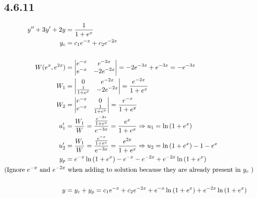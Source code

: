 \documentclass{article}
\begin{document}
\subsection{4.6.11}
\begin{align*}
    y''+3y'+2y &= \frac{1}{1+e^{x}}\\
    y_c &= c_1e^{-x}+c_2e^{-2x}\\\\
    W(e^{x},e^{2x}) &=  \begin{vmatrix}e^{-x} & e^{-2x}\\ e^{-x}& -2e^{-2x}\end{vmatrix} = -2e^{-3x}+e^{-3x}  = -e^{-3x}\\
    W_1 &= \begin{vmatrix} 0 & e^{-2x}\\ \frac{1}{1+e^{x}}  &-2e^{-2x}\end{vmatrix} = \frac{e^{-2x}}{1+e^{x}}     \\
    W_2 &= \begin{vmatrix} e^{-x} & 0\\ e^{-x} & \frac{1}{1+e^{x}} \end{vmatrix} = \frac{e^{-x}}{1+e^{x}}\\  
    u_1' &= \frac{W_1}{W}  = \frac{\frac{e^{-2x}}{1+e^{x}}}{e^{-3x}} =  \frac{e^{x}}{1+e^{x}}  \Rightarrow u_1  = \ln\left(1+e^{x}\right)     \\
    u_2' &= \frac{W_1}{W}  = \frac{\frac{e^{-x}}{1+e^{x}}}{e^{-3x}} = \frac{e^{2x}}{1+e^{x}}\Rightarrow u_2 = \ln\left(1+e^{x}\right)-1-e^{x}\\
    y_p  &= e^{-x}\ln\left(1+e^{x}\right)-e^{-x}-e^{-2x}+e^{-2x}\ln\left(1+e^{x}\right) \\
(\text{Ignore \( e^{-x} \) and \( e^{-2x} \)}&\text{ when adding to solution because they are already present in \( y_c \) }) \\\\
    y &= y_c+y_p = c_1e^{-x}+c_2e^{-2x}+ e^{-x}\ln\left(1+e^{x}\right)+e^{-2x}\ln\left(1+e^{x}\right)
\end{align*}
\end{document}
